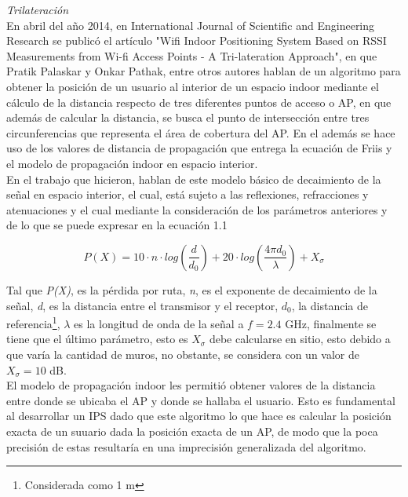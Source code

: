 \textit{Trilateración}\\

En abril del año 2014, en International Journal of Scientific and Engineering Research se publicó el artículo "Wifi Indoor Positioning System Based on RSSI Measurements from Wi-fi Access Points - A Tri-lateration Approach", en que Pratik Palaskar y Onkar Pathak, entre otros autores hablan de un algoritmo para obtener la posición de un usuario al interior de un espacio indoor mediante el cálculo de la distancia respecto de tres diferentes puntos de acceso o \ac{AP}, en que además de calcular la distancia, se busca el punto de intersección entre tres circunferencias que representa el área de cobertura del AP. En el además se hace uso de los valores de distancia de propagación que entrega la ecuación de Friis y el modelo de propagación indoor en espacio interior.\\

En el trabajo que hicieron, hablan de este modelo básico de decaimiento de la señal en espacio interior, el cual, está sujeto a las reflexiones, refracciones y atenuaciones y el cual mediante la consideración de los parámetros anteriores y de lo que se puede expresar en la ecuación 1.1

\begin{equation}
P(X) = 10\cdot{n}\cdot{log\left({\dfrac{d}{d_0}}\right)} + 20\cdot{log\left({\dfrac{4\pi d_0}{\lambda}}\right)}  + X_{\sigma}
\end{equation}

Tal que \textit{P(X)}, es la pérdida por ruta, \textit{n}, es el exponente de decaimiento de la señal, \textit{d}, es la distancia entre el transmisor y el receptor, \textit{$d_0$}, la distancia de referencia\footnote{Considerada como 1 m}, \textit{$\lambda$} es la longitud de onda de la señal a $f = 2.4$ GHz, finalmente se tiene que el  último parámetro, esto es \textit{$X_{\sigma}$} debe calcularse en sitio, esto debido a que varía la cantidad de muros, no obstante, se considera con un valor de $X_{\sigma} = 10$ dB.\\

El modelo de propagación indoor les permitió obtener valores de la distancia entre donde se ubicaba el AP y donde se hallaba el usuario. Esto es fundamental al desarrollar un \ac{IPS} dado que este algoritmo lo que hace es calcular la posición exacta de un suuario dada la posición exacta de un AP, de modo que la poca precisión de estas resultaría en una imprecisión generalizada del algoritmo. \\

